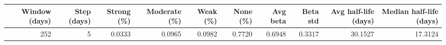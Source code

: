 \begin{tabular}{rrrrrrrrrr}
\toprule
Window (days) & Step (days) & Strong (\%) & Moderate (\%) & Weak (\%) & None (\%) & Avg beta & Beta std & Avg half-life (days) & Median half-life (days) \\
\midrule
252 & 5 & 0.0333 & 0.0965 & 0.0982 & 0.7720 & 0.6948 & 0.3317 & 30.1527 & 17.3124 \\
\bottomrule
\end{tabular}
